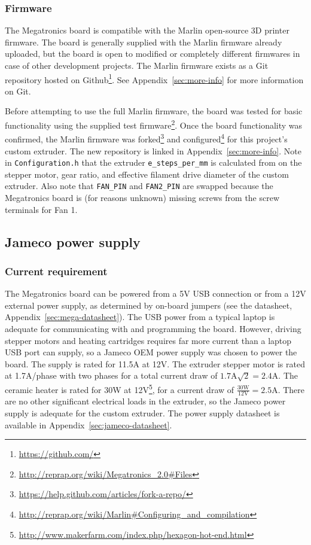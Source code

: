 \subsubsection{Firmware}
The Megatronics board is compatible with the Marlin open-source 3D printer firmware. The board is generally supplied with the Marlin firmware already uploaded, but the board is open to modified or completely different firmwares in case of other development projects. The Marlin firmware exists as a Git repository hosted on Github\footnote{\url{https://github.com/}}. See Appendix~\ref{sec:more-info} for more information on Git.

Before attempting to use the full Marlin firmware, the board was tested for basic functionality using the supplied test firmware\footnote{\url{http://reprap.org/wiki/Megatronics_2.0\#Files}}. Once the board functionality was confirmed, the Marlin firmware was forked\footnote{\url{https://help.github.com/articles/fork-a-repo/}} and configured\footnote{\url{http://reprap.org/wiki/Marlin\#Configuring_and_compilation}} for this project's custom extruder. The new repository is linked in Appendix~\ref{sec:more-info}. Note in \verb|Configuration.h| that the extruder \verb|e_steps_per_mm| is calculated from on the stepper motor, gear ratio, and effective filament drive diameter of the custom extruder. Also note that \verb|FAN_PIN| and \verb|FAN2_PIN| are swapped because the Megatronics board is (for reasons unknown) missing screws from the screw terminals for Fan 1.

\subsection{Jameco power supply}
\subsubsection{Current requirement}
The Megatronics board can be powered from a 5V USB connection or from a 12V external power supply, as determined by on-board jumpers (see the datasheet, Appendix~\ref{sec:mega-datasheet}). The USB power from a typical laptop is adequate for communicating with and programming the board. However, driving stepper motors and heating cartridges requires far more current than a laptop USB port can supply, so a Jameco OEM power supply was chosen to power the board. The supply is rated for 11.5A at 12V. The extruder stepper motor is rated at 1.7A/phase with two phases for a total current draw of \(1.7\si{\ampere}\sqrt{2}=2.4\si{\ampere}\). The ceramic heater is rated for 30W at 12V\footnote{\url{http://www.makerfarm.com/index.php/hexagon-hot-end.html}}, for a current draw of \(\frac{30\si{\watt}}{12\si{\volt}}=2.5\si{\ampere}\). There are no other significant electrical loads in the extruder, so the Jameco power supply is adequate for the custom extruder. The power supply datasheet is available in Appendix~\ref{sec:jameco-datasheet}.

